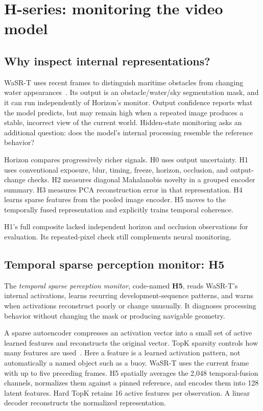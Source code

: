\documentclass[sigconf,nonacm]{acmart}
\begin{document}
\section{H-series: monitoring the video model}

\subsection{Why inspect internal representations?}
WaSR-T uses recent frames to distinguish maritime obstacles from changing water appearances~\cite{wasrt}. Its output is an obstacle/water/sky segmentation mask, and it can run independently of Horizon's monitor. Output confidence reports what the model predicts, but may remain high when a repeated image produces a stable, incorrect view of the current world. Hidden-state monitoring asks an additional question: does the model's internal processing resemble the reference behavior?

Horizon compares progressively richer signals. H0 uses output uncertainty. H1 uses conventional exposure, blur, timing, freeze, horizon, occlusion, and output-change checks. H2 measures diagonal Mahalanobis novelty in a grouped encoder summary. H3 measures PCA reconstruction error in that representation. H4 learns sparse features from the pooled image encoder. H5 moves to the temporally fused representation and explicitly trains temporal coherence.

H1's full composite lacked independent horizon and occlusion observations for evaluation. Its repeated-pixel check still complements neural monitoring.

\subsection{Temporal sparse perception monitor: H5}
The \emph{temporal sparse perception monitor}, code-named \textbf{H5}, reads WaSR-T's internal activations, learns recurring development-sequence patterns, and warns when activations reconstruct poorly or change unusually. It diagnoses processing behavior without changing the mask or producing navigable geometry.

A sparse autoencoder compresses an activation vector into a small set of active learned features and reconstructs the original vector. TopK sparsity controls how many features are used~\cite{gao}. Here a feature is a learned activation pattern, not automatically a named object such as a buoy. WaSR-T uses the current frame with up to five preceding frames. H5 spatially averages the 2,048 temporal-fusion channels, normalizes them against a pinned reference, and encodes them into 128 latent features. Hard TopK retains 16 active features per observation. A linear decoder reconstructs the normalized representation.
\end{document}
